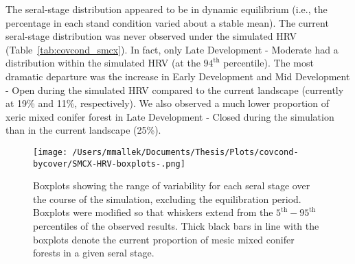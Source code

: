 The seral-stage distribution appeared to be in dynamic equilibrium (i.e., the percentage in each stand condition varied about a stable mean). The current seral-stage distribution was never observed under the simulated HRV (Table~\ref{tab:covcond_smcx}). In fact, only Late Development - Moderate had a distribution within the simulated HRV (at the $94^{\text{th}}$ percentile). The most dramatic departure was the increase in Early Development and Mid Development - Open during the simulated HRV compared to the current landscape (currently at 19\% and 11\%, respectively). We also observed a much lower proportion of xeric mixed conifer forest in Late Development - Closed during the simulation than in the current landscape (25\%). 

\begin{figure}[!htbp]
  \centering
    \texttt{[image: /Users/mmallek/Documents/Thesis/Plots/covcond-bycover/SMCX-HRV-boxplots-.png]}
  \caption{Boxplots showing the range of variability for each seral stage over the course of the simulation, excluding the equilibration period. Boxplots were modified so that whiskers extend from the $5^{\text{th}} - 95^{\text{th}}$ percentiles of the observed results. Thick black bars in line with the boxplots denote the current proportion of mesic mixed conifer forests in a given seral stage.} 
  \label{fig:covcond_smcx_boxplots}
\end{figure}


